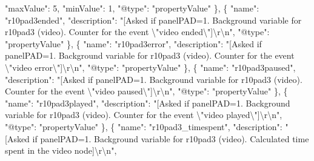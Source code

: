 \documentclass[
]{book}
\newenvironment{Shaded}{\begin{snugshade}}{\end{snugshade}}
\newcommand{\CharTok}[1]{\textcolor[rgb]{0.31,0.60,0.02}{#1}}
\newcommand{\DataTypeTok}[1]{\textcolor[rgb]{0.13,0.29,0.53}{#1}}
\newcommand{\DecValTok}[1]{\textcolor[rgb]{0.00,0.00,0.81}{#1}}
\newcommand{\FunctionTok}[1]{\textcolor[rgb]{0.00,0.00,0.00}{#1}}
\newcommand{\OtherTok}[1]{\textcolor[rgb]{0.56,0.35,0.01}{#1}}
\newcommand{\StringTok}[1]{\textcolor[rgb]{0.31,0.60,0.02}{#1}}
\begin{document}
\begin{Shaded}
\begin{Highlighting}[]
      \DataTypeTok{"maxValue"}\FunctionTok{:} \DecValTok{5}\FunctionTok{,}
      \DataTypeTok{"minValue"}\FunctionTok{:} \DecValTok{1}\FunctionTok{,}
      \DataTypeTok{"@type"}\FunctionTok{:} \StringTok{"propertyValue"}
    \FunctionTok{\}}\OtherTok{,}
    \FunctionTok{\{}
      \DataTypeTok{"name"}\FunctionTok{:} \StringTok{"r10pad3ended"}\FunctionTok{,}
      \DataTypeTok{"description"}\FunctionTok{:} \StringTok{"[Asked if panelPAD=1. Background variable for r10pad3 (video). Counter for the event }\CharTok{\textbackslash{}"}\StringTok{video ended}\CharTok{\textbackslash{}"}\StringTok{]}\CharTok{\textbackslash{}r\textbackslash{}n}\StringTok{"}\FunctionTok{,}
      \DataTypeTok{"@type"}\FunctionTok{:} \StringTok{"propertyValue"}
    \FunctionTok{\}}\OtherTok{,}
    \FunctionTok{\{}
      \DataTypeTok{"name"}\FunctionTok{:} \StringTok{"r10pad3error"}\FunctionTok{,}
      \DataTypeTok{"description"}\FunctionTok{:} \StringTok{"[Asked if panelPAD=1. Background variable for r10pad3 (video). Counter for the event }\CharTok{\textbackslash{}"}\StringTok{video error}\CharTok{\textbackslash{}"}\StringTok{]}\CharTok{\textbackslash{}r\textbackslash{}n}\StringTok{"}\FunctionTok{,}
      \DataTypeTok{"@type"}\FunctionTok{:} \StringTok{"propertyValue"}
    \FunctionTok{\}}\OtherTok{,}
    \FunctionTok{\{}
      \DataTypeTok{"name"}\FunctionTok{:} \StringTok{"r10pad3paused"}\FunctionTok{,}
      \DataTypeTok{"description"}\FunctionTok{:} \StringTok{"[Asked if panelPAD=1. Background variable for r10pad3 (video). Counter for the event }\CharTok{\textbackslash{}"}\StringTok{video paused}\CharTok{\textbackslash{}"}\StringTok{]}\CharTok{\textbackslash{}r\textbackslash{}n}\StringTok{"}\FunctionTok{,}
      \DataTypeTok{"@type"}\FunctionTok{:} \StringTok{"propertyValue"}
    \FunctionTok{\}}\OtherTok{,}
    \FunctionTok{\{}
      \DataTypeTok{"name"}\FunctionTok{:} \StringTok{"r10pad3played"}\FunctionTok{,}
      \DataTypeTok{"description"}\FunctionTok{:} \StringTok{"[Asked if panelPAD=1. Background variable for r10pad3 (video). Counter for the event }\CharTok{\textbackslash{}"}\StringTok{video played}\CharTok{\textbackslash{}"}\StringTok{]}\CharTok{\textbackslash{}r\textbackslash{}n}\StringTok{"}\FunctionTok{,}
      \DataTypeTok{"@type"}\FunctionTok{:} \StringTok{"propertyValue"}
    \FunctionTok{\}}\OtherTok{,}
    \FunctionTok{\{}
      \DataTypeTok{"name"}\FunctionTok{:} \StringTok{"r10pad3_timespent"}\FunctionTok{,}
      \DataTypeTok{"description"}\FunctionTok{:} \StringTok{"[Asked if panelPAD=1. Background variable for r10pad3 (video). Calculated time spent in the video node]}\CharTok{\textbackslash{}r\textbackslash{}n}\StringTok{"}\FunctionTok{,}

\end{Highlighting}
\end{Shaded}
\end{document}
